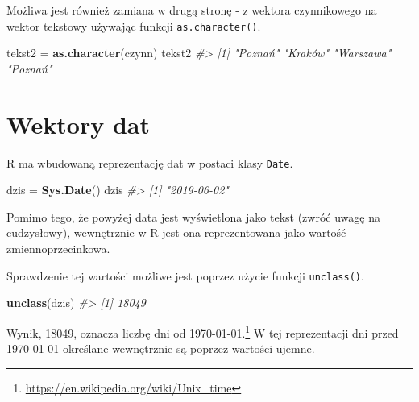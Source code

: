\documentclass[paper=6in:9in,pagesize=pdftex,headinclude=on,footinclude=on,10pt]{scrbook}
\newenvironment{Shaded}{\begin{snugshade}}{\end{snugshade}}
\newcommand{\CommentTok}[1]{\textcolor[rgb]{0.56,0.35,0.01}{\textit{#1}}}
\newcommand{\KeywordTok}[1]{\textcolor[rgb]{0.13,0.29,0.53}{\textbf{#1}}}
\newcommand{\NormalTok}[1]{#1}
\newcommand{\StringTok}[1]{\textcolor[rgb]{0.31,0.60,0.02}{#1}}
\begin{document}
Możliwa jest również zamiana w drugą stronę - z wektora czynnikowego na wektor tekstowy używając funkcji \texttt{as.character()}.

\begin{Shaded}
\begin{Highlighting}[]
\NormalTok{tekst2 =}\StringTok{ }\KeywordTok{as.character}\NormalTok{(czynn)}
\NormalTok{tekst2}
\CommentTok{#> [1] "Poznań"   "Kraków"   "Warszawa" "Poznań"}
\end{Highlighting}
\end{Shaded}

\hypertarget{ate}{%
\section{Wektory dat}\label{ate}}

R ma wbudowaną reprezentację dat w postaci klasy \texttt{Date}.

\begin{Shaded}
\begin{Highlighting}[]
\NormalTok{dzis =}\StringTok{ }\KeywordTok{Sys.Date}\NormalTok{()}
\NormalTok{dzis}
\CommentTok{#> [1] "2019-06-02"}
\end{Highlighting}
\end{Shaded}

Pomimo tego, że powyżej data jest wyświetlona jako tekst (zwróć uwagę na cudzysłowy), wewnętrznie w R jest ona reprezentowana jako wartość zmiennoprzecinkowa.

\begin{Shaded}
\end{Shaded}

Sprawdzenie tej wartości możliwe jest poprzez użycie funkcji \texttt{unclass()}.

\begin{Shaded}
\begin{Highlighting}[]
\KeywordTok{unclass}\NormalTok{(dzis)}
\CommentTok{#> [1] 18049}
\end{Highlighting}
\end{Shaded}

Wynik, 18049, oznacza liczbę dni od 1970-01-01.\footnote{\url{https://en.wikipedia.org/wiki/Unix_time}}
W tej reprezentacji dni przed 1970-01-01 określane wewnętrznie są poprzez wartości ujemne.
\end{document}
